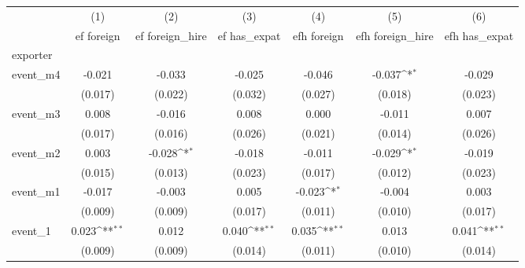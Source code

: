{
\def\sym#1{\ifmmode^{#1}\else\(^{#1}\)\fi}
\begin{tabular}{l*{6}{c}}
\hline\hline
            &\multicolumn{1}{c}{(1)}&\multicolumn{1}{c}{(2)}&\multicolumn{1}{c}{(3)}&\multicolumn{1}{c}{(4)}&\multicolumn{1}{c}{(5)}&\multicolumn{1}{c}{(6)}\\
            &\multicolumn{1}{c}{ef foreign}&\multicolumn{1}{c}{ef foreign\_hire}&\multicolumn{1}{c}{ef has\_expat}&\multicolumn{1}{c}{efh foreign}&\multicolumn{1}{c}{efh foreign\_hire}&\multicolumn{1}{c}{efh has\_expat}\\
\hline
exporter    &                     &                     &                     &                     &                     &                     \\
event\_m4    &      -0.021         &      -0.033         &      -0.025         &      -0.046         &      -0.037\sym{*}  &      -0.029         \\
            &     (0.017)         &     (0.022)         &     (0.032)         &     (0.027)         &     (0.018)         &     (0.023)         \\
[1em]
event\_m3    &       0.008         &      -0.016         &       0.008         &       0.000         &      -0.011         &       0.007         \\
            &     (0.017)         &     (0.016)         &     (0.026)         &     (0.021)         &     (0.014)         &     (0.026)         \\
[1em]
event\_m2    &       0.003         &      -0.028\sym{*}  &      -0.018         &      -0.011         &      -0.029\sym{*}  &      -0.019         \\
            &     (0.015)         &     (0.013)         &     (0.023)         &     (0.017)         &     (0.012)         &     (0.023)         \\
[1em]
event\_m1    &      -0.017         &      -0.003         &       0.005         &      -0.023\sym{*}  &      -0.004         &       0.003         \\
            &     (0.009)         &     (0.009)         &     (0.017)         &     (0.011)         &     (0.010)         &     (0.017)         \\
[1em]
event\_1     &       0.023\sym{**} &       0.012         &       0.040\sym{**} &       0.035\sym{**} &       0.013         &       0.041\sym{**} \\
            &     (0.009)         &     (0.009)         &     (0.014)         &     (0.011)         &     (0.010)         &     (0.014)         \\

\end{tabular}}
